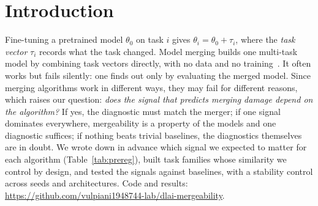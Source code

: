 \documentclass{article}
\makeatletter
\renewcommand{\printAffiliationsAndNotice}[1]{%
  {\let\thefootnote\relax\footnotetext{\hspace*{-\footnotesep}\Notice@String}}}
\makeatother
\begin{document}

\printAffiliationsAndNotice{}

\begin{abstract}
Model merging combines models fine-tuned from a common checkpoint by arithmetic on their weights, but whether a merge works is usually discovered only after performing it. We ask whether the pre-merge signal that best predicts merging damage depends on the merging algorithm. We fine-tune \nFTall{} models on CIFAR-100 task families whose similarity is set by a five-level dial, run \nMergeAll{} merges with weight averaging, task arithmetic, TIES and DARE, and test five signals against trivial baselines. The answer is no: the same similarity signals predict the damage for all four algorithms. CKA is the most reliable diagnostic and the only one that keeps its sign on a ResNet-18 control, where weight-space cosine reverses. We also show that weighted sign conflict is a function of cosine, and that DARE's apparent failure is an untuned scaling.
\end{abstract}

\section{Introduction}\label{sec:intro}

Fine-tuning a pretrained model $\theta_0$ on task $i$ gives $\theta_i = \theta_0 + \tau_i$, where the \emph{task vector} $\tau_i$ records what the task changed. Model merging builds one multi-task model by combining task vectors directly, with no data and no training~\cite{wortsman2022soups,ilharco2023editing}. It often works but fails silently: one finds out only by evaluating the merged model. Since merging algorithms work in different ways, they may fail for different reasons, which raises our question: \emph{does the signal that predicts merging damage depend on the algorithm?} If yes, the diagnostic must match the merger; if one signal dominates everywhere, mergeability is a property of the models and one diagnostic suffices; if nothing beats trivial baselines, the diagnostics themselves are in doubt. We wrote down in advance which signal we expected to matter for each algorithm (Table~\ref{tab:prereg}), built task families whose similarity we control by design, and tested the signals against baselines, with a stability control across seeds and architectures. Code and results: \url{https://github.com/vulpiani1948744-lab/dlai-mergeability}.
\end{document}
